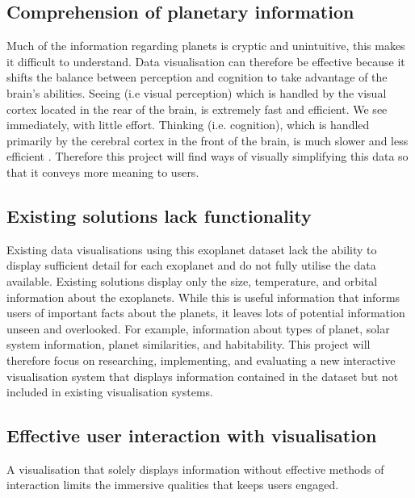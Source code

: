 \subsection{Comprehension of planetary information}
Much of the information regarding planets is cryptic and unintuitive, this makes
it difficult to understand. Data visualisation can therefore be effective
because it shifts the balance between perception and cognition to take advantage
of
the brain's abilities. Seeing (i.e visual perception) which is handled by the
visual cortex located in the rear of the brain, is extremely fast and efficient.
We see immediately, with little effort. Thinking (i.e. cognition), which is
handled primarily by the cerebral cortex in the front of the brain, is much
slower and less efficient \cite{few}. Therefore this project will find ways of
visually simplifying this data so that it conveys more meaning to users. 


\subsection{Existing solutions lack functionality}
Existing data visualisations using this exoplanet dataset lack the
ability to display sufficient detail for each exoplanet and do not fully utilise
the data available. Existing solutions display only the size, temperature,
and orbital information about the exoplanets. While this is useful information
that informs users of important facts about the planets, it leaves lots of
potential information unseen and overlooked. 
For example, information about types of planet, solar system information,
planet similarities, and habitability. This project will therefore focus on
researching, implementing, and evaluating a new interactive visualisation system
that displays information contained in the dataset but not
included in existing visualisation systems.

\subsection{Effective user interaction with visualisation}
A visualisation that solely displays information without effective methods of
interaction limits the immersive qualities that keeps users engaged.


